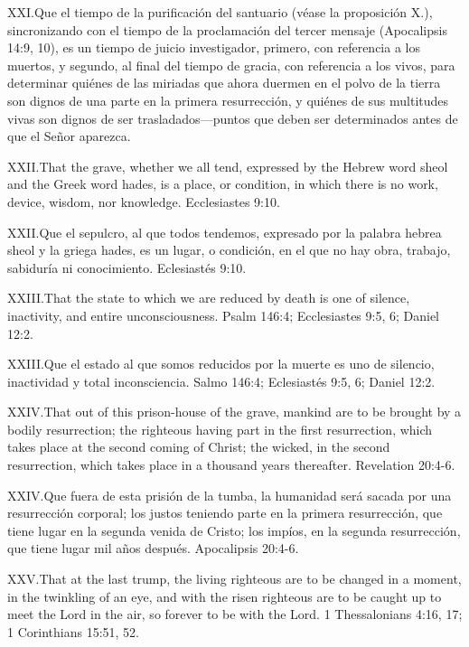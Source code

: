 \lettrine{XXI.} Que el tiempo de la purificación del santuario (véase la proposición X.), sincronizando con el tiempo de la proclamación del tercer mensaje (Apocalipsis 14:9, 10), es un tiempo de juicio investigador, primero, con referencia a los muertos, y segundo, al final del tiempo de gracia, con referencia a los vivos, para determinar quiénes de las miriadas que ahora duermen en el polvo de la tierra son dignos de una parte en la primera resurrección, y quiénes de sus multitudes vivas son dignos de ser trasladados—puntos que deben ser determinados antes de que el Señor aparezca.


\lettrine{XXII.} That the grave, whether we all tend, expressed by the Hebrew word sheol and the Greek word hades, is a place, or condition, in which there is no work, device, wisdom, nor knowledge. Ecclesiastes 9:10.


\lettrine{XXII.} Que el sepulcro, al que todos tendemos, expresado por la palabra hebrea sheol y la griega hades, es un lugar, o condición, en el que no hay obra, trabajo, sabiduría ni conocimiento. Eclesiastés 9:10.


\lettrine{XXIII.} That the state to which we are reduced by death is one of silence, inactivity, and entire unconsciousness. Psalm 146:4; Ecclesiastes 9:5, 6; Daniel 12:2.


\lettrine{XXIII.} Que el estado al que somos reducidos por la muerte es uno de silencio, inactividad y total inconsciencia. Salmo 146:4; Eclesiastés 9:5, 6; Daniel 12:2.


\lettrine{XXIV.} That out of this prison-house of the grave, mankind are to be brought by a bodily resurrection; the righteous having part in the first resurrection, which takes place at the second coming of Christ; the wicked, in the second resurrection, which takes place in a thousand years thereafter. Revelation 20:4-6.


\lettrine{XXIV.} Que fuera de esta prisión de la tumba, la humanidad será sacada por una resurrección corporal; los justos teniendo parte en la primera resurrección, que tiene lugar en la segunda venida de Cristo; los impíos, en la segunda resurrección, que tiene lugar mil años después. Apocalipsis 20:4-6.


\lettrine{XXV.} That at the last trump, the living righteous are to be changed in a moment, in the twinkling of an eye, and with the risen righteous are to be caught up to meet the Lord in the air, so forever to be with the Lord. 1 Thessalonians 4:16, 17; 1 Corinthians 15:51, 52.


